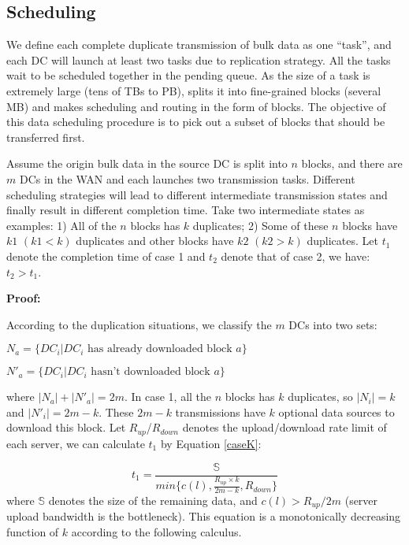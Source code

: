 \subsection{Scheduling}

We define each complete duplicate transmission of bulk data as one ``task'', and each DC will launch at least two tasks due to replication strategy. All the tasks wait to be scheduled together in the pending queue. As the size of a task is extremely large (tens of TBs to PB), \name splits it into fine-grained blocks (several MB) and makes scheduling and routing in the form of blocks. The objective of this data scheduling procedure is to pick out a subset of blocks that should be transferred first.

Assume the origin bulk data in the source DC is split into $n$ blocks, and there are $m$ DCs in the WAN and each launches two transmission tasks. Different scheduling strategies will lead to different intermediate transmission states and finally result in different completion time. Take two intermediate states as examples: 1) All of the $n$ blocks has $k$ duplicates; 2) Some of these $n$ blocks have $k1$ $(k1<k)$ duplicates and other blocks have $k2$ $(k2>k)$ duplicates. Let $t_1$ denote the completion time of case 1 and $t_2$ denote that of case 2, we have: $t_2 > t_1$.

\textbf{Proof:}

According to the duplication situations, we classify the $m$ DCs into two sets:

$N_a = \{DC_i|DC_i \text{ has already downloaded block $a$}\}$

$N'_a = \{DC_i|DC_i \text{ hasn't downloaded block $a$}\}$

where $|N_a| + |N'_a| = 2m$. In case 1, all the $n$ blocks has $k$ duplicates, so $|N_i| = k$ and $|N'_i| = 2m-k$. These $2m-k$ transmissions have $k$ optional data sources to download this block. Let $R_{up}$/$R_{down}$ denotes the upload/download rate limit of each server, we can calculate $t_1$ by Equation \ref{caseK}:

\begin{equation}
\label{caseK}
t_1 = \frac{\mathbb{S}}{min\{c(l),\frac{R_{up}\times k}{2m-k},R_{down}\}}
\end{equation}
where $\mathbb{S}$ denotes the size of the remaining data, and $c(l) > R_{up}/2m$ (server upload bandwidth is the bottleneck). This equation is a monotonically decreasing function of $k$ according to the following calculus.

